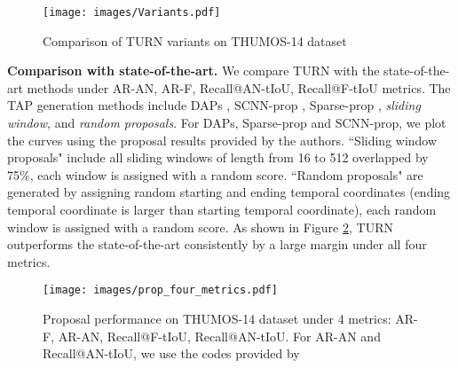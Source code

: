\documentclass[10pt,twocolumn,letterpaper]{article}
\begin{document}
\begin{figure}[]

  \centering
    \texttt{[image: images/Variants.pdf]}
    \caption{Comparison of TURN variants on THUMOS-14 dataset}
      \label{fig:compare_variant}
\end{figure}

\textbf{Comparison with state-of-the-art.} We compare TURN with the state-of-the-art methods under AR-AN, AR-F, Recall@AN-tIoU, Recall@F-tIoU metrics. The TAP generation methods include DAPs \cite{escorcia2016daps}, SCNN-prop \cite{Shou_2016_CVPR}, Sparse-prop \cite{Heilbron_2016_CVPR}, \textit{sliding window}, and \textit{random proposals}. For DAPs, Sparse-prop and SCNN-prop, we plot the curves using the proposal results provided by the authors. ``Sliding window proposals" include all sliding windows of length from 16 to 512 overlapped by 75\%, each window is assigned with a random score. ``Random proposals" are generated by assigning random starting and ending temporal coordinates (ending temporal coordinate is larger than starting temporal coordinate), each random window is assigned with a random score. As shown in Figure \ref{fig:compare_six}, TURN outperforms the state-of-the-art consistently by a large margin under all four metrics.

\begin{figure}[]
   \centering
    \texttt{[image: images/prop\_four\_metrics.pdf]}
    \caption{Proposal performance on THUMOS-14 dataset under 4 metrics: AR-F, AR-AN, Recall@F-tIoU, Recall@AN-tIoU. For AR-AN and Recall@AN-tIoU, we use the codes provided by \cite{escorcia2016daps}}
     \label{fig:compare_six}
\end{figure}
\end{document}
